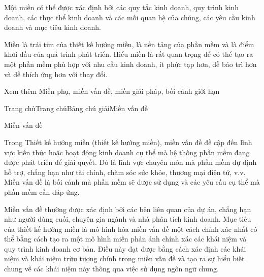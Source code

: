 Một miền có thể được xác định bởi các quy tắc kinh doanh, quy trình kinh doanh, các thực thể kinh doanh và các mối quan hệ của chúng, các yêu cầu kinh doanh và mục tiêu kinh doanh.

Miền là trái tim của thiết kế hướng miền, là nền tảng của phần mềm và là điểm khởi đầu của quá trình phát triển. Hiểu miền là rất quan trọng để có thể tạo ra một phần mềm phù hợp với nhu cầu kinh doanh, ít phức tạp hơn, dễ bảo trì hơn và dễ thích ứng hơn với thay đổi.

Xem thêm	 Miền phụ, miền vấn đề, miền giải pháp, bối cảnh giới hạn









Trang chủTrang chủBảng chú giảiMiền vấn đề

Miền vấn đề

Trong Thiết kế hướng miền (thiết kế hướng miền), miền vấn đề đề cập đến lĩnh vực kiến thức hoặc hoạt động kinh doanh cụ thể mà hệ thống phần mềm đang được phát triển để giải quyết. Đó là lĩnh vực chuyên môn mà phần mềm dự định hỗ trợ, chẳng hạn như tài chính, chăm sóc sức khỏe, thương mại điện tử, v.v. Miền vấn đề là bối cảnh mà phần mềm sẽ được sử dụng và các yêu cầu cụ thể mà phần mềm cần đáp ứng.

Miền vấn đề thường được xác định bởi các bên liên quan của dự án, chẳng hạn như người dùng cuối, chuyên gia ngành và nhà phân tích kinh doanh. Mục tiêu của thiết kế hướng miền là mô hình hóa miền vấn đề một cách chính xác nhất có thể bằng cách tạo ra một mô hình miền phản ánh chính xác các khái niệm và quy trình kinh doanh cơ bản. Điều này đạt được bằng cách xác định các khái niệm và khái niệm trừu tượng chính trong miền vấn đề và tạo ra sự hiểu biết chung về các khái niệm này thông qua việc sử dụng ngôn ngữ chung.

